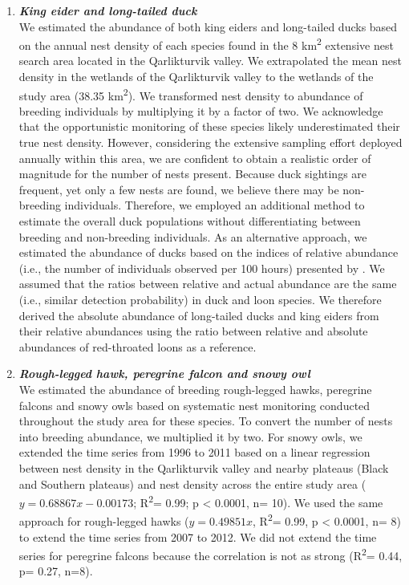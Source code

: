 \documentclass[a4paper,twoside,12pt]{article}
\begin{document}
\begin{enumerate}[label=\alph*.]
        			
        	\item[] \textit{\textbf{King eider and long-tailed duck}}\\
		We estimated the abundance of both king eiders and long-tailed ducks based on the annual nest density of each species found in the 8 km\textsuperscript{2} extensive nest search area located in the Qarlikturvik valley. We extrapolated the mean nest density in the wetlands of the Qarlikturvik valley to the wetlands of the study area (38.35 km\textsuperscript{2}). We transformed nest density to abundance of breeding individuals by multiplying it by a factor of two. We acknowledge that the opportunistic monitoring of these species likely underestimated their true nest density. However, considering the extensive sampling effort deployed annually within this area, we are confident to obtain a realistic order of magnitude for the number of nests present. Because duck sightings are frequent, yet only a few nests are found, we believe there may be non-breeding individuals. Therefore, we employed an additional method to estimate the overall duck populations without differentiating between breeding and non-breeding individuals. 
As an alternative approach, we estimated the abundance of ducks based on the indices of relative abundance (i.e., the number of individuals observed per 100 hours) presented by \citet{gauthier2024a}. We assumed that the ratios between relative and actual abundance are the same (i.e., similar detection probability) in duck and loon species. We therefore derived the absolute abundance of long-tailed ducks and king eiders from their relative abundances using the ratio between relative and absolute abundances of red-throated loons as a reference.
        			
        			
        	\item[] \textit{\textbf{Rough-legged hawk, peregrine falcon and snowy owl}} \\
        	We estimated the abundance of breeding rough-legged hawks, peregrine falcons and snowy owls based on systematic nest monitoring conducted throughout the study area for these species. To convert the number of nests into breeding abundance, we multiplied it by two. For snowy owls, we extended the time series from 1996 to 2011 based on a linear regression between nest density in the Qarlikturvik valley and nearby plateaus (Black and Southern plateaus) and nest density across the entire study area ($y= 0.68867x -0.00173$; R\textsuperscript{2}= 0.99; p < 0.0001, n= 10). We used the same approach for rough-legged hawks ($y=0.49851x$, R\textsuperscript{2}= 0.99, p < 0.0001, n= 8) to extend the time series from 2007 to 2012. We did not extend the time series for peregrine falcons because the correlation is not as strong (R\textsuperscript{2}= 0.44, p= 0.27, n=8).
        	

\end{enumerate}
\end{document}
